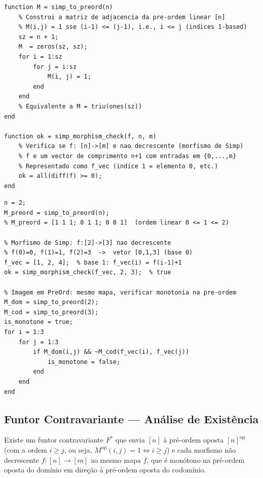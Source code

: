 \begin{lstlisting}[style=matlab, caption={Funtor $F: \mathbf{Simp} \to \mathbf{PreOrd}$ --- construção da pré-ordem de $[n]$}]
function M = simp_to_preord(n)
    % Constroi a matriz de adjacencia da pre-ordem linear [n]
    % M(i,j) = 1 sse (i-1) <= (j-1), i.e., i <= j (indices 1-based)
    sz = n + 1;
    M  = zeros(sz, sz);
    for i = 1:sz
        for j = i:sz
            M(i, j) = 1;
        end
    end
    % Equivalente a M = triu(ones(sz))
end

function ok = simp_morphism_check(f, n, m)
    % Verifica se f: [n]->[m] e nao decrescente (morfismo de Simp)
    % f e um vector de comprimento n+1 com entradas em {0,...,m}
    % Representado como f_vec (indice 1 = elemento 0, etc.)
    ok = all(diff(f) >= 0);
end
\end{lstlisting}

\begin{lstlisting}[style=matlab, caption={Exemplo: $F([2])$ e verificação de morfismo}]
n = 2;
M_preord = simp_to_preord(n);
% M_preord = [1 1 1; 0 1 1; 0 0 1]  (ordem linear 0 <= 1 <= 2)

% Morfismo de Simp: f:[2]->[3] nao decrescente
% f(0)=0, f(1)=1, f(2)=3  ->  vetor [0,1,3] (base 0)
f_vec = [1, 2, 4];  % base 1: f_vec(i) = f(i-1)+1
ok = simp_morphism_check(f_vec, 2, 3);  % true

% Imagem em PreOrd: mesmo mapa, verificar monotonia na pre-ordem
M_dom = simp_to_preord(2);
M_cod = simp_to_preord(3);
is_monotone = true;
for i = 1:3
    for j = 1:3
        if M_dom(i,j) && ~M_cod(f_vec(i), f_vec(j))
            is_monotone = false;
        end
    end
end
\end{lstlisting}

\subsection{Funtor Contravariante --- Análise de Existência}

\begin{proposition}
Existe um funtor contravariante $F^*$ que envia $[n]$ à pré-ordem oposta $[n]^{\mathrm{op}}$ (com a ordem $i \geq j$, ou seja, $M^{\mathrm{op}}(i,j) = 1 \iff i \geq j$) e cada morfismo não decrescente $f: [n] \to [m]$ ao mesmo mapa $f$, que é monótono na pré-ordem oposta do domínio em direção à pré-ordem oposta do codomínio.
\end{proposition}

